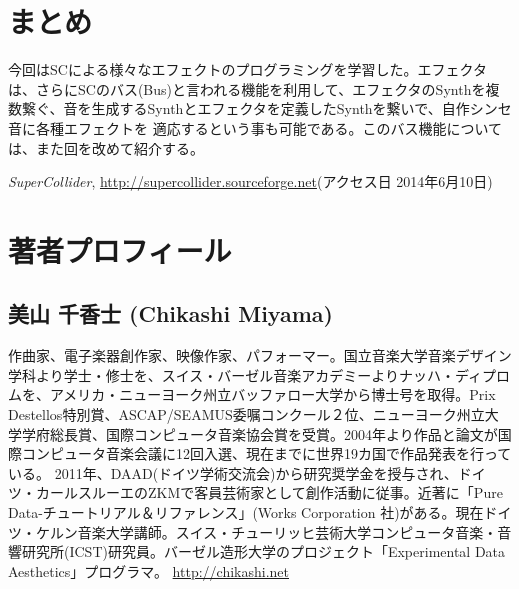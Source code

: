 \documentclass{jsarticle}
\begin{document}
\section{まとめ}
今回はSCによる様々なエフェクトのプログラミングを学習した。エフェクタは、さらにSCのバス(Bus)と言われる機能を利用して、エフェクタのSynthを複数繋ぐ、音を生成するSynthとエフェクタを定義したSynthを繋いで、自作シンセ音に各種エフェクトを
適応するという事も可能である。このバス機能については、また回を改めて紹介する。


\begin{thebibliography}{citations}
   {\it SuperCollider}, \url{http://supercollider.sourceforge.net}(アクセス日 2014年6月10日)
\end{thebibliography}

\section{著者プロフィール}
\subsection*{美山 千香士 (Chikashi Miyama)}
作曲家、電子楽器創作家、映像作家、パフォーマー。国立音楽大学音楽デザイン学科より学士・修士を、スイス・バーゼル音楽アカデミーよりナッハ・ディプロムを、アメリカ・ニューヨーク州立バッファロー大学から博士号を取得。Prix Destellos特別賞、ASCAP/SEAMUS委嘱コンクール２位、ニューヨーク州立大学学府総長賞、国際コンピュータ音楽協会賞を受賞。2004年より作品と論文が国際コンピュータ音楽会議に12回入選、現在までに世界19カ国で作品発表を行っている。 2011年、DAAD(ドイツ学術交流会)から研究奨学金を授与され、ドイツ・カールスルーエのZKMで客員芸術家として創作活動に従事。近著に「Pure Data-チュートリアル＆リファレンス」(Works Corporation 社)がある。現在ドイツ・ケルン音楽大学講師。スイス・チューリッヒ芸術大学コンピュータ音楽・音響研究所(ICST)研究員。バーゼル造形大学のプロジェクト「Experimental Data Aesthetics」プログラマ。
\url{http://chikashi.net}
\end{document}
